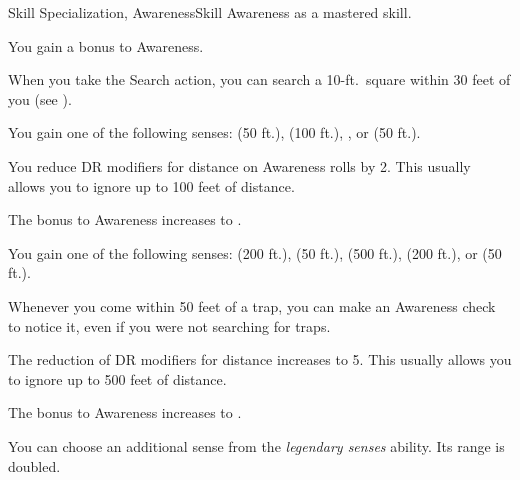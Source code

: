     \begin{feat}{Skill Specialization, Awareness}{Skill}
        \featpre Awareness as a mastered skill.

         You gain a  bonus to Awareness.

         When you take the Search action, you can search a 10-ft.\ square within 30 feet of you (see ).

         You gain one of the following senses:  (50 ft.),  (100 ft.), , or  (50 ft.).

         You reduce DR modifiers for distance on Awareness rolls by 2.
        This usually allows you to ignore up to 100 feet of distance.


         The bonus to Awareness increases to .

         You gain one of the following senses:  (200 ft.),  (50 ft.),  (500 ft.),  (200 ft.), or  (50 ft.).

         Whenever you come within 50 feet of a trap, you can make an Awareness check to notice it, even if you were not searching for traps.

         The reduction of DR modifiers for distance increases to 5.
        This usually allows you to ignore up to 500 feet of distance.

         The bonus to Awareness increases to .

         You can choose an additional sense from the \textit{legendary senses} ability.
        Its range is doubled.
    \end{feat}

